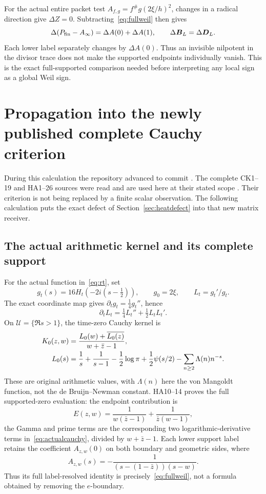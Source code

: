 \documentclass[11pt,a4paper]{article}
\theoremstyle{definition}\newtheorem{definition}[theorem]{Definition}\newtheorem{remark}[theorem]{Remark}
\begin{document}
For the actual entire packet test $A_{f,g}=f^\#g(2\xi/h)^2$, changes in a radical direction give $\Delta Z=0$. Subtracting~\eqref{eq:fullweil} then gives
\begin{equation}
 \Delta(P_{\rm fin}-A_\infty)=\Delta A(0)+\Delta A(1),
 \qquad\Delta\boldsymbol B_L=\Delta\boldsymbol D_L.       \label{eq:compensate}
\end{equation}
Each lower label separately changes by $\Delta A(0)$. Thus an invisible nilpotent in the divisor trace does not make the supported endpoints individually vanish. This is the exact full-supported comparison needed before interpreting any local sign as a global Weil sign.

\section{Propagation into the newly published complete Cauchy criterion}\label{sec:cauchy}
During this calculation the repository advanced to commit
.
The complete CK1--19 and HA1--26 sources were read and are used here at their stated scope \cite{CK,HA}. Their criterion is not being replaced by a finite scalar observation. The following calculation puts the exact defect of Section~\ref{sec:heatdefect} into that new matrix receiver.

\subsection{The actual arithmetic kernel and its complete support}
For the actual function in~\eqref{eq:rt}, set
\[
 g_t(s)=16H_t(-2i(s-\tfrac12)),\qquad
 g_0=2\xi,\qquad L_t=g_t'/g_t.
\]
The exact coordinate map gives $\partial_tg_t=\tfrac14g_t''$, hence
\begin{equation}
 \partial_tL_t=\tfrac14L_t''+\tfrac12L_tL_t'.
                                                        \label{eq:cauchyburgers}
\end{equation}
On $\mathcal U=\{\Re s>1\}$, the time-zero Cauchy kernel is
\begin{align}
 K_0(z,w)&=\frac{L_0(w)+\overline{L_0(z)}}{w+\bar z-1},\notag\\
 L_0(s)&=\frac1s+\frac1{s-1}-\frac12\log\pi
       +\frac12\psi(s/2)-\sum_{n\ge2}\Lambda(n)n^{-s}.
                                                        \label{eq:actualcauchy}
\end{align}
These are original arithmetic values, with $\Lambda(n)$ here the von Mangoldt function, not the de Bruijn--Newman constant. HA10--14 proves the full supported-zero evaluation: the endpoint contribution is
\[
 E(z,w)=\frac1{w(\bar z-1)}+\frac1{\bar z(w-1)},
\]
the Gamma and prime terms are the corresponding two logarithmic-derivative terms in~\eqref{eq:actualcauchy}, divided by $w+\bar z-1$. Each lower support label retains the coefficient $A_{z,w}(0)$ on both boundary and geometric sides, where
\[
 A_{z,w}(s)=-\frac1{(s-(1-\bar z))(s-w)}.
\]
Thus its full label-resolved identity is precisely~\eqref{eq:fullweil}, not a formula obtained by removing the $e$-boundary.
\end{document}
